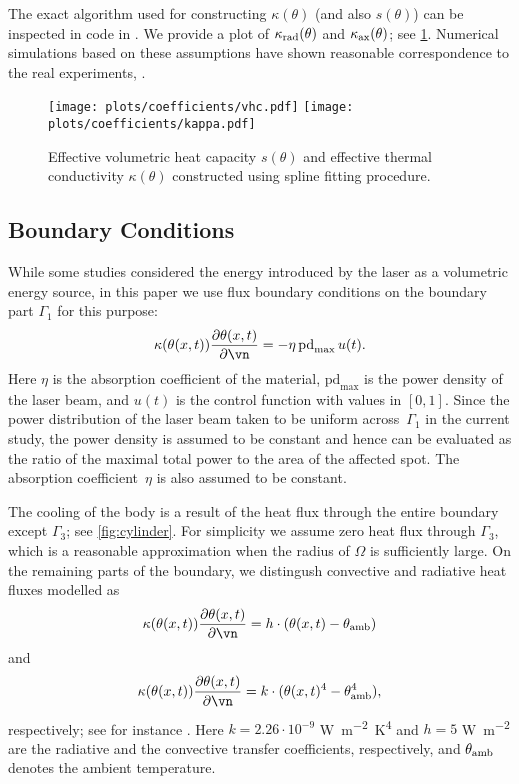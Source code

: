The exact algorithm used for constructing $\kappa(\theta)$ (and also $s(\theta)$) can be inspected in code in \cite[\texttt{optipuls.coefficients}]{optipuls_github}. 
We provide a plot of $\kappa_\textup{rad}(\theta)$ and $\kappa_\textup{ax}(\theta)$; see \cref{fig:coef}.
Numerical simulations based on these assumptions have shown reasonable correspondence to the real experiments, .

\begin{figure}[ht]
	\centering
	\texttt{[image: plots/coefficients/vhc.pdf]}
	\texttt{[image: plots/coefficients/kappa.pdf]}
	\caption{Effective volumetric heat capacity $s(\theta)$ and effective thermal conductivity $\kappa(\theta)$ constructed using spline fitting procedure.}
	\label{fig:coef}
\end{figure}


\subsection{Boundary Conditions}
\label{subsec:boundary_conditions}

While some studies considered the energy introduced by the laser as a volumetric energy source, in this paper we use flux boundary conditions on the boundary part $\Gamma_1$ for this purpose:
\begin{equation}
	\kappa(\theta(x,t)) \frac{\partial \theta(x,t)}{\partial \vn} 
	= 
	- \eta \, \text{pd}_{\max} \, u(t)
	.
\end{equation}
Here $\eta$ is the absorption coefficient of the material, $\text{pd}_{\max}$ is the power density of the laser beam, and $u(t)$ is the control function with values in $[0,1]$.
Since the power distribution of the laser beam taken to be uniform across~$\Gamma_1$ in the current study, the power density is assumed to be constant and hence can be evaluated as the ratio of the maximal total power to the area of the affected spot. 
The absorption coefficient~$\eta$ is also assumed to be constant.

The cooling of the body is a result of the heat flux through the entire boundary except $\Gamma_3$; see \cref{fig:cylinder}.
For simplicity we assume zero heat flux through $\Gamma_3$, which is a reasonable approximation when the radius of $\Omega$ is sufficiently large.
On the remaining parts of the boundary, we distingush convective and radiative heat fluxes modelled as
\begin{equation}
	\kappa(\theta(x,t)) \frac{\partial \theta(x,t)}{\partial \vn} 
	= 
	h \cdot (\theta(x,t) - \theta_\textup{amb})
\end{equation}
and
\begin{equation}
	\kappa(\theta(x,t)) \frac{\partial \theta(x,t)}{\partial \vn} 
	= 
	k \cdot (\theta(x,t)^4 - \theta^4_\textup{amb})
	,
\end{equation}
respectively; see for instance \cite[Chapter~3]{Sluzalec:2005:1}.
Here $k = 2.26 \cdot 10^{-9}$ \si{\W\per\m^2\K^4} and $h = 5$ \si{\W\per\m^2} are the radiative and the convective transfer coefficients, respectively, and $\theta_\textup{amb}$ denotes the ambient temperature.


